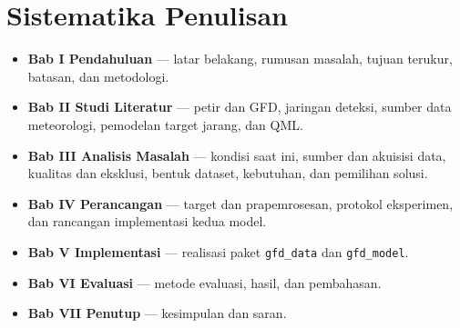 \section{Sistematika Penulisan}

\begin{itemize}
    \item \textbf{Bab I Pendahuluan} --- latar belakang, rumusan masalah,
          tujuan terukur, batasan, dan metodologi.
    \item \textbf{Bab II Studi Literatur} --- petir dan GFD, jaringan deteksi,
          sumber data meteorologi, pemodelan target jarang, dan QML.
    \item \textbf{Bab III Analisis Masalah} --- kondisi saat ini, sumber dan
          akuisisi data, kualitas dan eksklusi, bentuk dataset, kebutuhan, dan
          pemilihan solusi.
    \item \textbf{Bab IV Perancangan} --- target dan prapemrosesan, protokol
          eksperimen, dan rancangan implementasi kedua model.
    \item \textbf{Bab V Implementasi} --- realisasi paket \texttt{gfd\_data}
          dan \texttt{gfd\_model}.
    \item \textbf{Bab VI Evaluasi} --- metode evaluasi, hasil, dan pembahasan.
    \item \textbf{Bab VII Penutup} --- kesimpulan dan saran.
\end{itemize}
